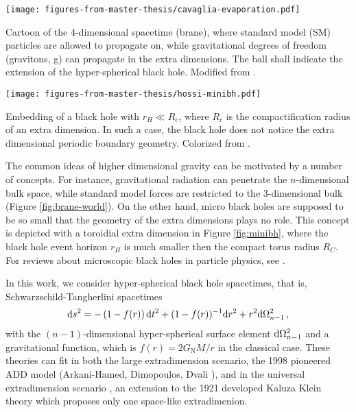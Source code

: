\begin{marginfigure}
	\texttt{[image: figures-from-master-thesis/cavaglia-evaporation.pdf]}
	\caption[
	Brane world physics, figure modified from \cite{cavaglia}
	\cite{Koeppel2014})
	]{Cartoon of the 4-dimensional spacetime (brane), where standard model (SM)
		particles are allowed to propagate on, while gravitational degrees of
		freedom (\ie gravitons, g) can propagate in the extra dimensions. The 
		ball shall indicate the extension of the hyper-spherical black hole.
		Modified from \cite{cavaglia}.}\label{fig:brane-world}
	\vspace{1cm}
	\texttt{[image: figures-from-master-thesis/hossi-minibh.pdf]}
	\caption[
	Embedding of mini black holes in compactified extra dimensions, figure
	modified from \cite{Hos04}.
	]{Embedding of a black hole with $r_H \ll R_c$, where $R_c$ is the compactification
		radius of an extra dimension. In such a case, the black hole does not notice
		the extra dimensional periodic boundary geometry. Colorized from
		\cite{Hos04}.
	}\label{fig:minibh}
\end{marginfigure}

The common ideas of higher dimensional gravity can be motivated by a number of
concepts. For instance, gravitational radiation can penetrate the $n$-dimensional
bulk space, while standard model forces are restricted to the 3-dimensional bulk
(Figure \ref{fig:brane-world}). On the other hand, micro black holes are supposed
to be so small that the geometry of the extra dimensions plays no role.
This concept is depicted with a toroidial extra dimension in Figure \ref{fig:minibh},
where the black hole event horizon $r_H$ is much smaller then the compact torus radius
$R_C$. For reviews about microscopic black holes in particle physics, see
\cite{Lan02,Cav03,Kan04,Hos04,CaS06,Win07,BlN10,Cal10a,Par12,NMS13,BlN14,KaW15}.

In this work, we consider hyper-spherical black hole spacetimes, that is,
Schwarz\-schild-Tangherlini spacetimes~\cite{Tangherlini:1963bw, Emparan:2008eg}
\begin{equation}\label{eq:STM-f}
\mathrm{d} s^2 = -\left( 1 - f(r) \right)\mathrm{d} t^2 + 
(1 - f(r))^{-1}\mathrm{d} r^2 + r^2 \mathrm{d}\Omega^2_{n-1}\,,
\end{equation}
with the $(n-1)$-dimensional hyper-spherical surface element $\mathrm{d}\Omega^2_{n-1}$
and a gravitational function, which is $f(r)=2 G_\mathrm{N} M/r$ in the classical
case.
These theories can fit in both the large extradimension scenario, \ie the
1998 pioneered ADD model (Arkani-Hamed, Dimopoulos, Dvali \cite{ADD98,ADD99,AAD98}),
and in the universal extradimension scenario \cite{ACD01}, \ie an extension to
the 1921 developed Kaluza Klein theory \cite{Overduin:1998pn,historyGoenner}
which proposes only one space-like extradimenion.


